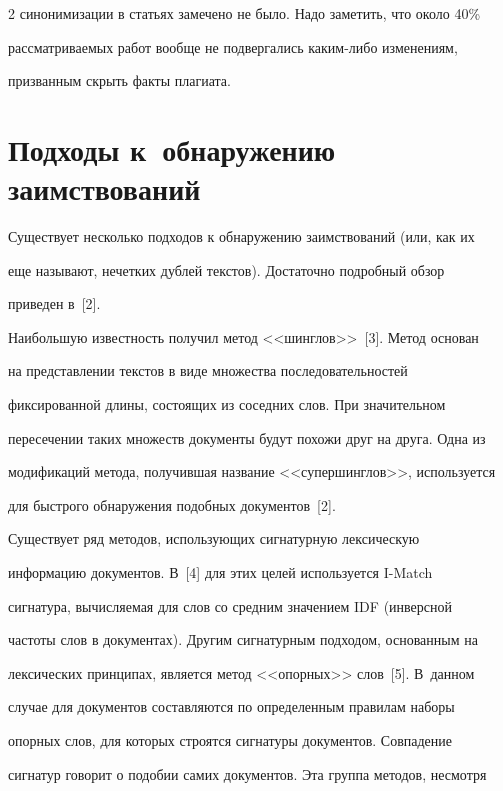 \begin{multicols}{2}
синонимизации в статьях замечено не было. Надо заметить, что около 40\% 

рассматриваемых работ вообще не подвергались каким-либо изменениям, 

призванным скрыть факты плагиата.







\section{Подходы к~обнаружению заимствований}



  Существует несколько подходов к обнаружению заимствований (или, как их 

еще называют, нечетких дублей текстов). Достаточно подробный обзор 

приведен в~[2].

  

  Наибольшую известность получил метод <<шинглов>>~[3]. Метод основан 

на представлении текстов в виде множества последовательностей 

фиксированной длины, состоящих из соседних слов. При значительном 

пересечении таких множеств документы будут похожи друг на друга. Одна из 

модификаций метода, получившая название <<супершинглов>>, используется 

для быстрого обнаружения подобных документов~[2].

  

  Существует ряд методов, использующих сигнатурную лексическую 

информацию документов. В~[4] для этих целей используется {I-Match} 

сигнатура, вычисляемая для слов со средним значением {IDF} (инверсной 

частоты слов в документах). Другим сигнатурным подходом, основанным на 

лексических принципах, является метод <<опорных>> слов~[5]. В~данном 

случае для документов со\-став\-ля\-ют\-ся по определенным правилам наборы 

опорных слов, для которых строятся сигнатуры документов. Совпадение 

сигнатур говорит о подобии самих документов. Эта группа методов, несмотря 


\end{multicols}
